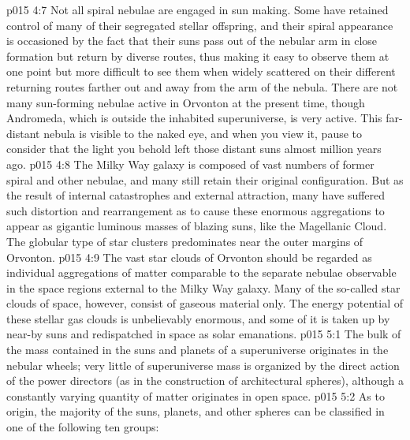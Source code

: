 \vs p015 4:7 Not all spiral nebulae are engaged in sun making. Some have retained control of many of their segregated stellar offspring, and their spiral appearance is occasioned by the fact that their suns pass out of the nebular arm in close formation but return by diverse routes, thus making it easy to observe them at one point but more difficult to see them when widely scattered on their different returning routes farther out and away from the arm of the nebula. There are not many sun\hyp{}forming nebulae active in Orvonton at the present time, though Andromeda, which is outside the inhabited superuniverse, is very active. This far\hyp{}distant nebula is visible to the naked eye, and when you view it, pause to consider that the light you behold left those distant suns almost million years ago.
\vs p015 4:8 The Milky Way galaxy is composed of vast numbers of former spiral and other nebulae, and many still retain their original configuration. But as the result of internal catastrophes and external attraction, many have suffered such distortion and rearrangement as to cause these enormous aggregations to appear as gigantic luminous masses of blazing suns, like the Magellanic Cloud. The globular type of star clusters predominates near the outer margins of Orvonton.
\vs p015 4:9 The vast star clouds of Orvonton should be regarded as individual aggregations of matter comparable to the separate nebulae observable in the space regions external to the Milky Way galaxy. Many of the so\hyp{}called star clouds of space, however, consist of gaseous material only. The energy potential of these stellar gas clouds is unbelievably enormous, and some of it is taken up by near-by suns and redispatched in space as solar emanations.
\vs p015 5:1 The bulk of the mass contained in the suns and planets of a superuniverse originates in the nebular wheels; very little of superuniverse mass is organized by the direct action of the power directors (as in the construction of architectural spheres), although a constantly varying quantity of matter originates in open space.
\vs p015 5:2 As to origin, the majority of the suns, planets, and other spheres can be classified in one of the following ten groups:
